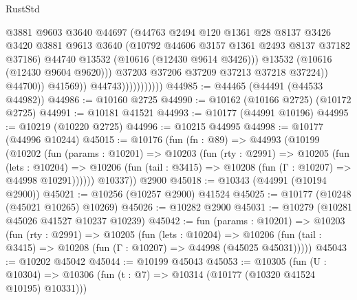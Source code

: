 \begin{lexlean}{RustStd}
\begin{coremodule}
                                        @3881
                                        @9603
                                        @3640
                                        @44697
                                        (@44763
                                          @2494
                                          @120
                                          @1361
                                          @28
                                          @8137
                                          @3426
                                          @3420
                                          @3881
                                          @9613
                                          @3640
                                          (@10792 @44606 @3157 @1361 @2493 @8137 @37182 @37186)
                                          @44740
                                          @13532
                                          (@10616 (@12430 @9614 @3426)))
                                        @13532
                                        (@10616 (@12430 @9604 @9620)))
                                      @37203
                                      @37206
                                      @37209
                                      @37213
                                      @37218
                                      @37224))
                                  @44700))
                              @41569))
                          @44743)))))))))))
@44985 := @44465 (@44491 (@44533 @44982))
@44986 := @10160 @2725
@44990 := @10162 (@10166 @2725) (@10172 @2725)
@44991 := @10181 @41521
@44993 := @10177 (@44991 @10196)
@44995 := @10219 (@10220 @2725)
@44996 := @10215 @44995
@44998 := @10177 (@44996 @10244)
@45015 := @10176
    (fun (fn : @89) =>
    @44993
      (@10199
        (@10202
          (fun (params : @10201) =>
          @10203
            (fun (rty : @2991) =>
            @10205
              (fun (lets : @10204) =>
              @10206 (fun (tail : @3415) => @10208 (fun (Γ : @10207) => @44998 @10291))))))
        @10337))
    @2900
@45018 := @10343 (@44991 (@10194 @2900))
@45021 := @10256 (@10257 @2900) @41524
@45025 := @10177 (@10248 (@45021 @10265) @10269)
@45026 := @10282 @2900
@45031 := @10279 (@10281 @45026 @41527 @10237 @10239)
@45042 := fun (params : @10201) =>
  @10203
    (fun (rty : @2991) =>
    @10205
      (fun (lets : @10204) =>
      @10206 (fun (tail : @3415) => @10208 (fun (Γ : @10207) => @44998 (@45025 @45031)))))
@45043 := @10202 @45042
@45044 := @10199 @45043
@45053 := @10305
    (fun (U : @10304) => @10306 (fun (t : @7) => @10314 (@10177 (@10320 @41524 @10195) @10331)))

\end{coremodule}
\end{lexlean}
